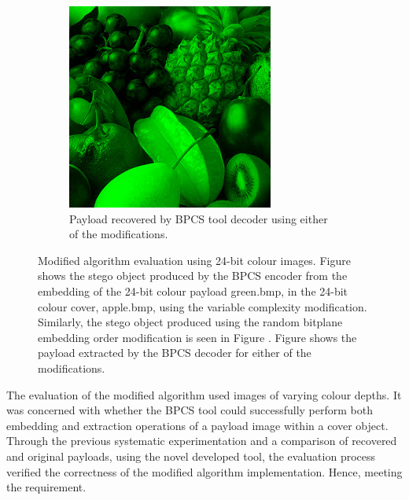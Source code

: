 \documentclass{l4proj}
\begin{document}
\begin{figure}[]
    \begin{subfigure}[b]{0.3\textwidth}
        \includegraphics[width=\textwidth]{images/green.png}
        \caption{Payload recovered by BPCS tool decoder using either of the modifications.}
        \label{fig:extracted_modified_colourincolour}
    \end{subfigure}
    \caption{Modified algorithm evaluation using 24-bit colour images. Figure  shows the stego object produced by the BPCS encoder from the embedding of the 24-bit colour payload green.bmp, in the 24-bit colour cover, apple.bmp, using the variable complexity modification. Similarly, the stego object produced using the random bitplane embedding order modification is seen in Figure . Figure  shows the payload extracted by the BPCS decoder for either of the modifications.}
\end{figure}

The evaluation of the modified algorithm used images of varying colour depths. It was concerned with whether the BPCS tool could successfully perform both embedding and extraction operations of a payload image within a cover object. Through the previous systematic experimentation and a comparison of recovered and original payloads, using the novel developed tool, the evaluation process verified the correctness of the modified algorithm implementation. Hence, meeting the requirement.
\end{document}
